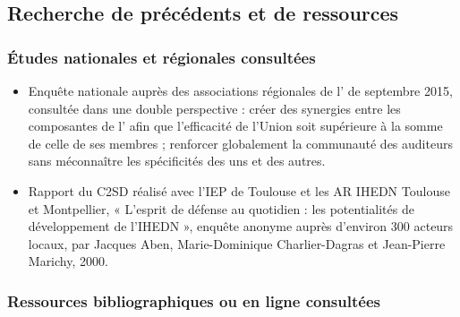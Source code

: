 \clearpage

\subsection*{Recherche de précédents et de ressources}

\subsubsection*{Études nationales et régionales consultées}

\begin{itemize}[leftmargin=*]
    \item Enquête nationale auprès des associations régionales de l'\UnionIHEDN{} de septembre 2015, consultée dans une double perspective : créer des synergies entre les composantes de l'\UnionIHEDN{} afin que l'efficacité de l'Union soit supérieure à la somme de celle de ses membres ; renforcer globalement la communauté des auditeurs sans méconnaître les spécificités des uns et des autres.
    \item Rapport du C2SD réalisé avec l'IEP de Toulouse et les AR IHEDN Toulouse et Montpellier, « L'esprit de défense au quotidien : les potentialités de développement de l'IHEDN », enquête anonyme auprès d'environ 300 acteurs locaux, par Jacques Aben, Marie-Dominique Charlier-Dagras et Jean-Pierre Marichy, 2000.
\end{itemize}

\subsubsection*{Ressources bibliographiques ou en ligne consultées}

